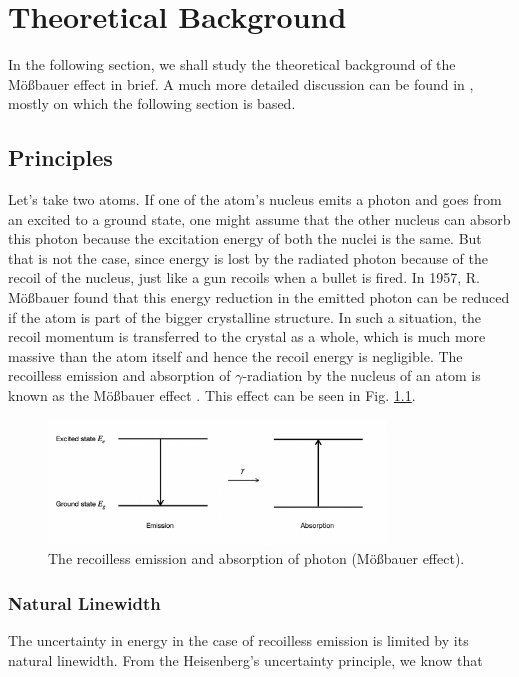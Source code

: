 \documentclass[a4paper]{report}
\numberwithin{equation}{section}
\begin{document}
\chapter{Theoretical Background}
In the following section, we shall study the theoretical background of the M\"o{\ss}bauer effect in brief. A much more detailed discussion can be found in \cite{Schatz1996}, mostly on which the following section is based.

\section{Principles} \label{sec:principles}

Let's take two atoms. If one of the atom's nucleus emits a photon and goes from an excited to a ground state, one might assume that the other nucleus can absorb this photon because the excitation energy of both the nuclei is the same. But that is not the case, since energy is lost by the radiated photon because of the recoil of the nucleus, just like a gun recoils when a bullet is fired. In 1957, R. M\"o{\ss}bauer found that this energy reduction in the emitted photon can be reduced if the atom is part of the bigger crystalline structure. In such a situation, the recoil momentum is transferred to the crystal as a whole, which is much more massive than the atom itself and hence the recoil energy is negligible. The recoilless emission and absorption of $\gamma $-radiation by the nucleus of an atom is known as the M\"o{\ss}bauer effect \cite{Schatz1996}. This effect can be seen in Fig. \ref{fig:moess}.

\begin{figure}[htpb]
    \centering
    \includegraphics[width=0.8\textwidth]{moessbauer-effect}
    \caption{The recoilless emission and absorption of photon (M\"o{\ss}bauer effect).}
    \label{fig:moess}
\end{figure}

\subsection{Natural Linewidth}
The uncertainty in energy in the case of recoilless emission is limited by its natural linewidth. From the Heisenberg's uncertainty principle, we know that 
\end{document}
